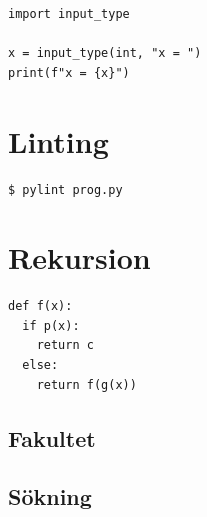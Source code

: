 \begin{frame}[fragile]
  \begin{example}
    \begin{lstlisting}
import input_type

x = input_type(int, "x = ")
print(f"x = {x}")
    \end{lstlisting}
  \end{example}
\end{frame}


\section{Linting}

\begin{frame}[fragile]
  \begin{lstlisting}[numbers=none,basicstyle=\huge]
$ pylint prog.py
  \end{lstlisting}
\end{frame}

\section{Rekursion}

\begin{frame}[fragile]
  \begin{lstlisting}[basicstyle=\huge,numbers=none]
def f(x):
  if p(x):
    return c
  else:
    return f(g(x))
  \end{lstlisting}
\end{frame}

\subsection{Fakultet}

\begin{frame}[fragile]
  \begin{example}
    
  \end{example}
\end{frame}

\begin{frame}[fragile]
  \begin{example}
    
  \end{example}
\end{frame}

\subsection{Sökning}


